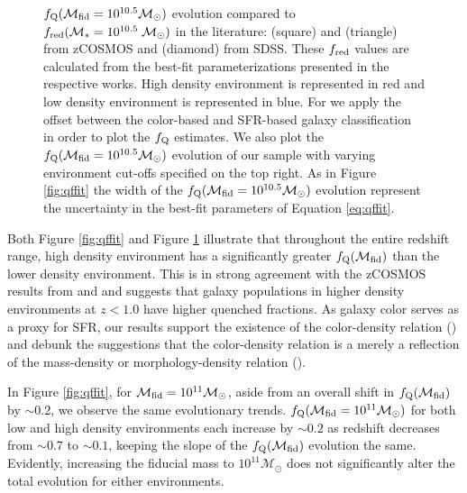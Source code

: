 \documentclass{emulateapj}
\begin{document}
\begin{figure}
    \begin{center}
        \leavevmode
        \caption{$f_{\rm{Q}}(\mathcal{M}_{\rm{fid}}=10^{10.5} \mathcal{M}_\odot)$ evolution compared to $f_{\rm{red}}(\mathcal{M}_{*}=10^{10.5} \; \mathcal{M}_{\odot})$ in the literature: \cite{Iovino:2010aa} (square) and \cite{Kovac:2014aa} (triangle) from zCOSMOS and \cite{Baldry:2006aa} (diamond) from SDSS. These $f_{\rm{red}}$ values are calculated from the best-fit parameterizations presented in the respective works. High density environment is represented in red and low density environment is represented in blue. For \cite{Kovac:2014aa} we apply the offset between the color-based and SFR-based galaxy classification in order to plot the $f_{\rm{Q}}$ estimates. We also plot the $f_{\rm{Q}}(\mathcal{M}_{\rm{fid}} = 10^{10.5} \mathcal{M}_\odot)$ evolution of our sample with varying environment cut-offs specified on the top right. As in Figure \ref{fig:qffit} the width of the $f_{\rm{Q}}(\mathcal{M}_{\rm{fid}} = 10^{10.5} \mathcal{M}_\odot)$ evolution represent the uncertainty in the best-fit parameters of Equation \ref{eq:qffit}.}         \label{fig:qffit_comp}
    \end{center}
\end{figure}

Both Figure \ref{fig:qffit} and Figure \ref{fig:qffit_comp} illustrate that throughout the entire redshift range, high density environment has a significantly greater $f_{\rm{Q}}(\mathcal{M}_{\rm{fid}})$ than the lower density environment. This is in strong agreement with the zCOSMOS results from \cite{Cucciati:2010aa} and \cite{Kovac:2014aa} and suggests that galaxy populations in higher density environments at $z < 1.0$ have higher quenched fractions. As galaxy color serves as a proxy for SFR, our results support the existence of the color-density relation (\citealt{Cucciati:2010aa, Cooper:2010aa}) and debunk the suggestions that the color-density relation is a merely a reflection of the mass-density or morphology-density relation (\citealt{Scodeggio:2009aa, Tasca:2009aa}).  

In Figure \ref{fig:qffit}, for $\mathcal{M}_{\rm{fid}} = 10^{11} \mathcal{M}_\odot$, aside from an overall shift in $f_{\rm{Q}}(\mathcal{M}_{\rm{fid}})$ by $\sim 0.2$, we observe the same evolutionary trends. $f_{\rm{Q}}(\mathcal{M}_{\rm{fid}} = 10^{11}\mathcal{M}_{\odot})$ for both low and high density environments each increase by $\sim 0.2$ as redshift decreases from $\sim 0.7$ to $\sim 0.1$, keeping the slope of the $f_{\rm{Q}}(\mathcal{M}_{\rm{fid}})$ evolution the same. Evidently, increasing the fiducial mass to $10^{11} \mathcal{M}_{\odot}$ does not significantly alter the total evolution for either environments. 
\end{document}
